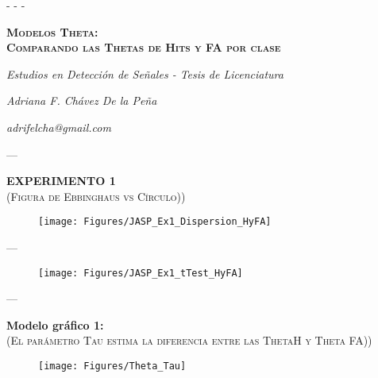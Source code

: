 \documentclass[a4paper ]{article}
\begin{document}
- - -

\vspace{50mm}
\begin{center}
{\Huge \textsc{\textbf{Modelos Theta:}}}\\
{\Huge \textsc{\textbf{Comparando las Thetas de Hits y FA por clase}}}\\
\vspace{20mm}
\end{center}

\begin{center}
\textit{\huge Estudios en Detección de Señales - Tesis de Licenciatura}\\
\bigskip
\end{center}

\begin{center}
\textit{\huge Adriana F. Chávez De la Peña}\\
\end{center}

\begin{center}
\vfill
\textit{\huge adrifelcha@gmail.com}\\
\end{center}

\newpage



---
\begin{center}
{\LARGE \textbf{EXPERIMENTO 1} }\\
{\small \textsc{(Figura de Ebbinghaus vs Círculo))}}\\
\end{center}
\begin{figure}[h]
\centering
\texttt{[image: Figures/JASP\_Ex1\_Dispersion\_HyFA]}
\end{figure}
\clearpage


---
\begin{figure}[h]
\centering
\texttt{[image: Figures/JASP\_Ex1\_tTest\_HyFA]}
\end{figure}
\clearpage


---
\begin{center}
{\LARGE \textbf{Modelo gráfico 1:} }\\
{\small \textsc{(El parámetro Tau estima la diferencia entre las ThetaH y Theta FA))}}\\
\smallskip
\end{center}

\begin{figure}[h]
\centering
\texttt{[image: Figures/Theta\_Tau]}
\end{figure}
\clearpage
\end{document}
